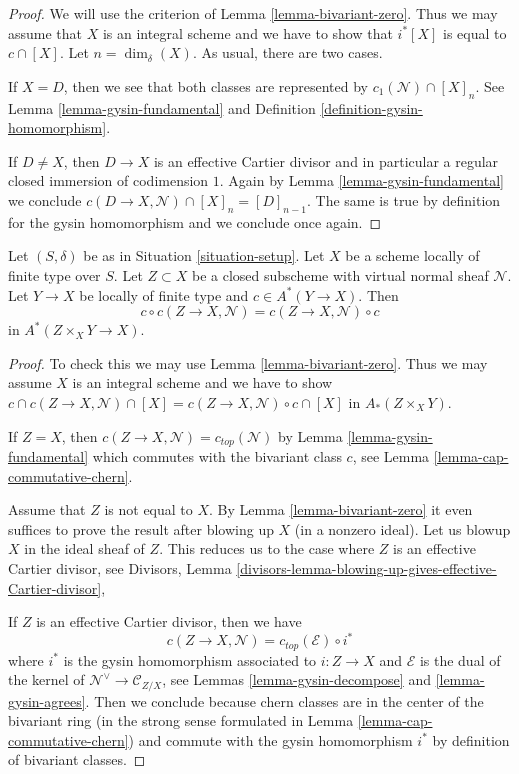 \begin{proof}
We will use the criterion of Lemma \ref{lemma-bivariant-zero}.
Thus we may assume that $X$ is an integral scheme and
we have to show that $i^*[X]$ is equal to $c \cap [X]$.
Let $n = \dim_\delta(X)$. As usual, there are two cases.

\medskip\noindent
If $X = D$, then we see that both classes are represented by
$c_1(\mathcal{N}) \cap [X]_n$. See Lemma \ref{lemma-gysin-fundamental}
and Definition \ref{definition-gysin-homomorphism}.

\medskip\noindent
If $D \not = X$, then $D \to X$ is an effective Cartier divisor
and in particular a regular closed immersion of codimension $1$.
Again by Lemma \ref{lemma-gysin-fundamental} we conclude
$c(D \to X, \mathcal{N}) \cap [X]_n = [D]_{n - 1}$. The same
is true by definition for the gysin homomorphism and we conclude
once again.
\end{proof}

\begin{lemma}
\label{lemma-gysin-commutes}
Let $(S, \delta)$ be as in Situation \ref{situation-setup}. Let $X$ be a scheme
locally of finite type over $S$. Let $Z \subset X$ be a closed subscheme
with virtual normal sheaf $\mathcal{N}$. Let $Y \to X$ be locally of
finite type and $c \in A^*(Y \to X)$. Then
$$
c \circ c(Z \to X, \mathcal{N}) =
c(Z \to X, \mathcal{N}) \circ c
$$
in $A^*(Z \times_X Y \to X)$.
\end{lemma}

\begin{proof}
To check this we may use Lemma \ref{lemma-bivariant-zero}.
Thus we may assume $X$ is an integral scheme and we have to show
$c \cap c(Z \to X, \mathcal{N}) \cap [X] =
c(Z \to X, \mathcal{N}) \circ c \cap [X]$ in $A_*(Z \times_X Y)$.

\medskip\noindent
If $Z = X$, then $c(Z \to X, \mathcal{N}) = c_{top}(\mathcal{N})$ by
Lemma \ref{lemma-gysin-fundamental} which commutes
with the bivariant class $c$, see Lemma \ref{lemma-cap-commutative-chern}.

\medskip\noindent
Assume that $Z$ is not equal to $X$. By Lemma \ref{lemma-bivariant-zero}
it even suffices to prove the result after blowing up $X$ (in a nonzero ideal).
Let us blowup $X$ in the ideal sheaf of $Z$. This reduces us to the case
where $Z$ is an effective Cartier divisor, see
Divisors, Lemma
\ref{divisors-lemma-blowing-up-gives-effective-Cartier-divisor},

\medskip\noindent
If $Z$ is an effective Cartier divisor, then we have
$$
c(Z \to X, \mathcal{N}) =
c_{top}(\mathcal{E}) \circ i^*
$$
where $i^*$ is the gysin homomorphism associated to $i : Z \to X$
and $\mathcal{E}$ is the dual of the kernel of
$\mathcal{N}^\vee \to \mathcal{C}_{Z/X}$, see
Lemmas \ref{lemma-gysin-decompose} and \ref{lemma-gysin-agrees}.
Then we conclude because chern classes are in the center of the
bivariant ring (in the strong sense formulated in
Lemma \ref{lemma-cap-commutative-chern}) and commute
with the gysin homomorphism $i^*$ by definition of bivariant classes.
\end{proof}









